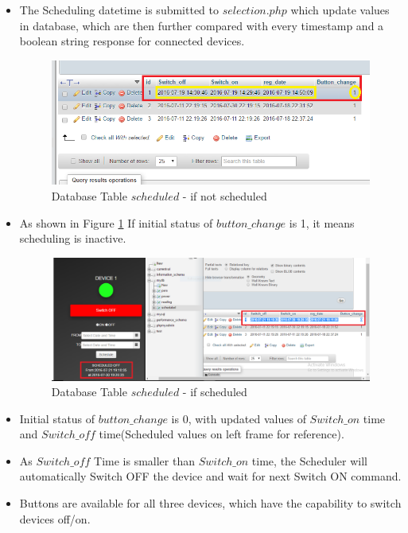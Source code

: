 \documentclass[a4paper,12pt,oneside]{book}
\begin{document}
\begin{itemize}
\begin{itemize}
		\item{The Scheduling datetime is submitted to $selection.php$ which update values in database, which are then further compared with every timestamp and a boolean string response for connected devices.}
		
		\begin{figure}[H]  \centering
			\includegraphics[width=15cm]{scheduled.png}
			\caption{ Database Table $scheduled$ - if not scheduled }
			\label{18}
		\end{figure}
		\item{As shown in Figure \ref{18} If initial status of $button\_change$ is 1, it means scheduling is inactive.}
		\begin{figure}[H]  \centering
			\includegraphics[width=15cm]{scheduled_table.png}
			\caption{ Database Table $scheduled$ - if scheduled }
			\label{19}
		\end{figure}
		
		\item{Initial status of $button\_change$ is 0, with updated values of $Switch\_on$ time and $Switch\_off$ time(Scheduled values on left frame for reference).}
		
		\item{As $Switch\_off$ Time is smaller than $Switch\_on$ time, the Scheduler will automatically Switch OFF the device and wait for next Switch ON command.}
		
		\item{Buttons are available for all three devices, which have the capability to switch devices off/on.}
		

\end{itemize}
\end{itemize}
\end{document}
